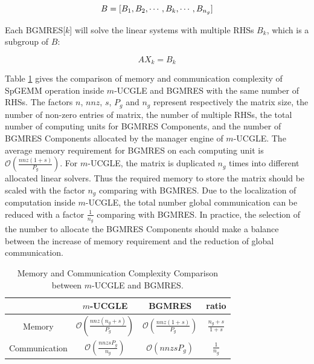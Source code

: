 \begin{equation}
B = [B_1, B_2, \cdots, B_k, \cdots, B_{n_g}] ~\\
\end{equation}

Each BGMRES[$k$] will solve the linear systems with multiple RHSs $B_k$, which is a subgroup of $B$:

\begin{equation}
\label{eq_sub}
AX_k = B_k
\end{equation}

Table \ref{memory} gives the comparison of memory and communication complexity of SpGEMM operation inside $m$-UCGLE and BGMRES with the same number of RHSs. The factors $n$, $nnz$, $s$, $P_g$ and $n_g$ represent respectively the matrix size, the number of non-zero entries of matrix, the number of multiple RHSs, the total number of computing units for BGMRES Components, and the number of BGMRES Components allocated by the manager engine of $m$-UCGLE. The average memory requirement for BGMRES on each computing unit is $\mathcal{O}(\frac{nnz(1+s)}{P_{g}})$. For $m$-UCGLE, the matrix is duplicated $n_g$ times into different allocated linear solvers. Thus the required memory to store the matrix should be scaled with the factor $n_g$ comparing with BGMRES. Due to the localization of computation inside $m$-UCGLE, the total number global communication can be reduced with a factor $\frac{1}{n_g}$ comparing with BGMRES. In practice, the selection of the number to allocate the BGMRES Components should make a balance between the increase of memory requirement and the reduction of global communication.

\begin{table}[htbp]
	\renewcommand{\arraystretch}{1.4}
	\small	
	\caption{Memory and Communication Complexity Comparison between $m$-UCGLE and BGMRES.}
	\label{memory}
	\centering
	\begin{tabular}{c|c|c|c}
		\toprule
		\cellcolor{gray!50}& \cellcolor{gray!50}$m$-UCGLE & \cellcolor{gray!50}BGMRES & \cellcolor{gray!50}ratio  \\
		\midrule
		Memory  &$\mathcal{O}(\frac{nnz(n_g+s)}{P_{g}})$& $\mathcal{O}(\frac{nnz(1+s)}{P_{g}})$ & $\frac{n_g+s}{1+s}$\\
		\midrule
		\cellcolor{gray!20}Communication & \cellcolor{gray!20}$\mathcal{O}(\frac{nnzsP_g}{n_g})$ & \cellcolor{gray!20}$\mathcal{O}(nnzsP_g)$ & \cellcolor{gray!20}$\frac{1}{n_g}$   \\
		\bottomrule
	\end{tabular}
\end{table}

